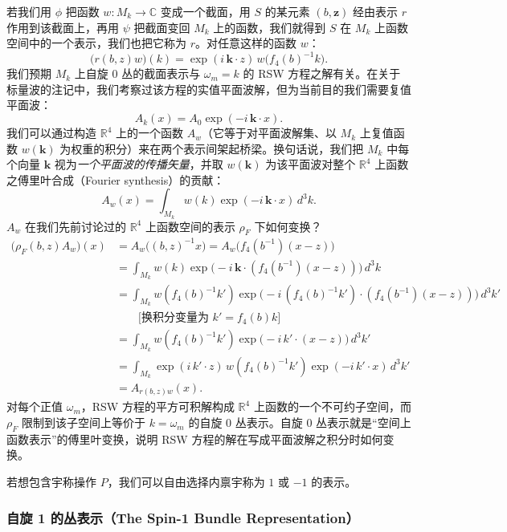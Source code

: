 若我们用 $\phi$ 把函数 $w:M_k\to\mathbb{C}$ 变成一个截面，用 $S$ 的某元素 $(b,\mathbf{z})$ 经由表示 $r$ 作用到该截面上，再用 $\psi$ 把截面变回 $M_k$ 上的函数，我们就得到 $S$ 在 $M_k$ 上函数空间中的一个表示，我们也把它称为 $r$。对任意这样的函数 $w$：
\begin{equation}
\big(r(b,z)w\big)(k)=\exp(i\,\mathbf{k}\cdot z)\,w\big(f_4(b)^{-1}k\big). \tag{4.2.6}
\end{equation}
我们预期 $M_k$ 上自旋 0 丛的截面表示与 $\omega_m=k$ 的 RSW 方程之解有关。在关于标量波的注记中，我们考察过该方程的实值平面波解，但为当前目的我们需要复值平面波：
\[
A_k(x)=A_0\exp(-i\,\mathbf{k}\cdot x).
\]
我们可以通过构造 $\mathbb{R}^4$ 上的一个函数 $A_w$（它等于对平面波解集、以 $M_k$ 上复值函数 $w(\mathbf{k})$ 为权重的积分）来在两个表示间架起桥梁。换句话说，我们把 $M_k$ 中每个向量 $\mathbf{k}$ 视为\emph{一个平面波的传播矢量}，并取 $w(\mathbf{k})$ 为该平面波对整个 $\mathbb{R}^4$ 上函数之傅里叶合成（Fourier synthesis）的贡献：
\[
A_w(x)=\int_{M_k}w(k)\exp(-i\,\mathbf{k}\cdot x)\,d^3k .
\]
$A_w$ 在我们先前讨论过的 $\mathbb{R}^4$ 上函数空间的表示 $\rho_F$ 下如何变换？
\begin{align*}
\big(\rho_F(b,z)A_w\big)(x)
&=A_w\big((b,z)^{-1}x\big)=A_w\big(f_4(b^{-1})(x-z)\big)\\
&=\int_{M_k}w(k)\exp\big(-i\,\mathbf{k}\cdot(f_4(b^{-1})(x-z))\big)\,d^3k\\
&=\int_{M_k}w(f_4(b)^{-1}k')\exp\big(-i\,(f_4(b)^{-1}k')\cdot(f_4(b^{-1})(x-z))\big)\,d^3k'\\
&\qquad\text{[换积分变量为 $k'=f_4(b)k$]}\\
&=\int_{M_k}w(f_4(b)^{-1}k')\exp\big(-i\,k'\cdot(x-z)\big)\,d^3k'\\
&=\int_{M_k}\exp(i\,k'\cdot z)\,w(f_4(b)^{-1}k')\exp(-i\,k'\cdot x)\,d^3k'\\
&=A_{r(b,z)w}(x).
\end{align*}
对每个正值 $\omega_m$，RSW 方程的平方可积解构成 $\mathbb{R}^4$ 上函数的一个不可约子空间，而 $\rho_F$ 限制到该子空间上等价于 $k=\omega_m$ 的自旋 0 丛表示。自旋 0 丛表示就是“空间上函数表示”的傅里叶变换，说明 RSW 方程的解在写成平面波解之积分时如何变换。

若想包含宇称操作 $P$，我们可以自由选择内禀宇称为 $1$ 或 $-1$ 的表示。

\subsubsection{自旋 1 的丛表示（The Spin-1 Bundle Representation）}

